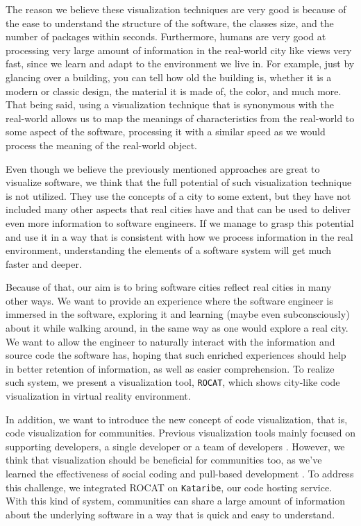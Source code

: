 \documentclass[conference]{IEEEtran}
\begin{document}
The reason we believe these visualization techniques are very good is because of the ease to understand the structure of the software, the classes size, and the number of packages within seconds.
Furthermore, humans are very good at processing very large amount of information in the real-world city like views very fast, since we learn and adapt to the environment we live in.
For example, just by glancing over a building, you can tell how old the building is, whether it is a modern or classic design, the material it is made of, the color, and much more.
That being said, using a visualization technique that is synonymous with the real-world allows us to map the meanings of characteristics from the real-world to some aspect of the software, processing it with a similar speed as we would process the meaning of the real-world object.

Even though we believe the previously mentioned approaches are great to visualize software, we think that the full potential of such visualization technique is not utilized.
They use the concepts of a city to some extent, but they have not included many other aspects that real cities have and that can be used to deliver even more information to software engineers.
If we manage to grasp this potential and use it in a way that is consistent with how we process information in the real environment, understanding the elements of a software system will get much faster and deeper.

Because of that, our aim is to bring software cities reflect real cities in many other ways.
We want to provide an experience where the software engineer is immersed in the software, exploring it and learning (maybe even subconsciously) about it while walking around, in the same way as one would explore a real city.
We want to allow the engineer to naturally interact with the information and source code the software has, hoping that such enriched experiences should help in better retention of information, as well as easier comprehension.
To realize such system, we present a visualization tool, \texttt{ROCAT}, which shows city-like code visualization in virtual reality environment.

In addition, we want to introduce the new concept of code visualization, that is, code visualization for communities.
Previous visualization tools mainly focused on supporting developers, a single developer \cite{Wettel:2011:SSC:1985793.1985868} or a team of developers \cite{6648194}.
However, we think that visualization should be beneficial for communities too, as we've learned the effectiveness of social coding \cite{Dabbish:2012:SCG:2145204.2145396} and pull-based development \cite{Gousios:2014:ESP:2568225.2568260}.
To address this challenge, we integrated ROCAT on \texttt{Kataribe},  our code hosting service.
With this kind of system, communities can share a large amount of information about the underlying software in a way that is quick and easy to understand.
\end{document}
